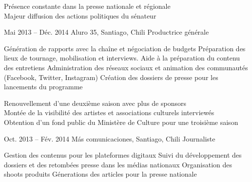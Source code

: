 \documentclass[30pt, french]{tccv}
\begin{document}
\begin{upshape}
\begin{experience}
\begin{itemize}
    \end{itemize}     
 Présence constante dans la presse nationale et régionale  \\
\mission{}            Majeur diffusion des actions politiques du sénateur
    
    
    
\setlength{\parskip}{0pt}        
\item{Mai 2013 -- Déc. 2014}
     {Aluro 35, Santiago, Chili}
     {Productrice générale}
     \fontsize{9pt}{1em}\color{text}\bodyfontlight\upshape\selectfont
%
    
    \setlength{\parskip}{-10pt}
    \begin{itemize}
      \setlength\itemsep{-3pt} 
      \cvitem[\checkmark] Génération de rapports avec la chaîne et négociation de budgets                       
      \cvitem[\checkmark] Préparation des lieux de tournage, mobilisation et interviews. Aide à la préparation du contenu des entretiens 
      \cvitem[\checkmark] Administration des réseaux sociaux et animation des communautés (Facebook, Twitter, Instagram)                 
      \cvitem[\checkmark] Création des dossiers de presse pour les lancements du programme                                             
    \end{itemize}     
 Renouvellement d'une deuxième saison avec plus de sponsors \\
\mission{}	     Montée de la visibilité des artistes et associations culturels interviewés \\
\mission{}           Obtention d’un fond public du Ministère de Culture pour une troisième saison  \\




\setlength{\parskip}{0pt}    
\item{Oct. 2013 -- Fév. 2014 }     
  {Más comunicaciones, Santiago, Chili}     
  {Journaliste}
     \fontsize{9pt}{1em}\color{text}\bodyfontlight\upshape\selectfont
%    

\setlength{\parskip}{-10pt}
\begin{itemize}
      \setlength\itemsep{-3pt} 
      \cvitem[\checkmark]  Gestion des contenus pour les plateformes digitaux                                     
      \cvitem[\checkmark]  Suivi du développement des dossiers et des retombées presse dans les médias nationaux                                             
      \cvitem[\checkmark]  Organisation des shoots produits 
      \cvitem[\checkmark]  Génerations des articles pour la presse nationale


\end{itemize}
\end{experience}
\end{upshape}
\end{document}
